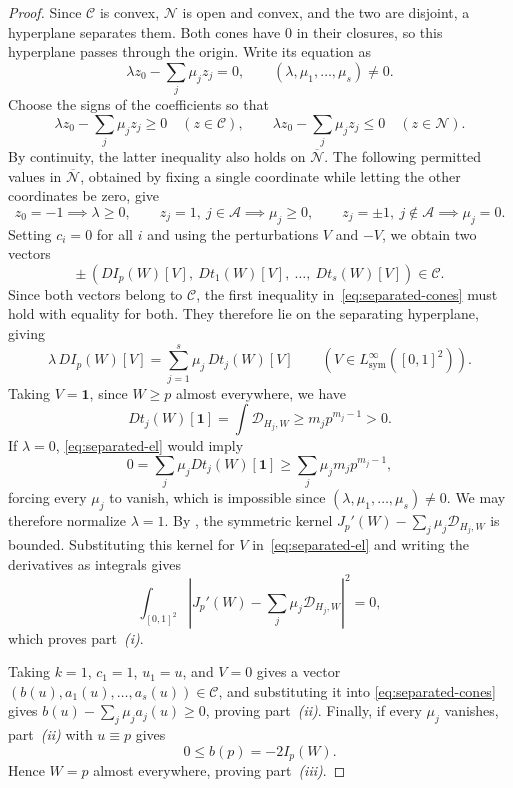 \begin{proof}
Since $\mathcal C$ is convex, $\mathcal N$ is open and
convex, and the two are disjoint, a hyperplane separates them.
Both cones have $0$ in their closures, so this hyperplane passes through
the origin.  Write its equation as
\[
  \lambda z_0-\sum_j\mu_jz_j=0,\qquad
  (\lambda,\mu_1,\dots,\mu_s)\ne0.
\]
Choose the signs of the coefficients so that
\begin{equation}\label{eq:separated-cones}
  \lambda z_0-\sum_j\mu_jz_j\ge0\quad(z\in\mathcal C),\qquad
  \lambda z_0-\sum_j\mu_jz_j\le0\quad(z\in\mathcal N).
\end{equation}
By continuity, the latter inequality also holds on $\overline{\mathcal N}$.
The following permitted values in $\overline {\mathcal N}$,
obtained by fixing a single coordinate while letting the other coordinates be zero, give
\[
  z_0=-1 \implies \lambda\ge0,
  \qquad z_j=1,\ j\in\mathcal A \implies \mu_j\ge0,
  \qquad z_j=\pm1,\ j\notin\mathcal A \implies \mu_j=0.
\]
Setting $c_i=0$ for all $i$ and using the perturbations $V$ and $-V$, we obtain two vectors
\[
  \pm\,(DI_p(W)[V],\ Dt_1(W)[V],\ \dots,\ Dt_s(W)[V])\in\mathcal C.
\]
Since both vectors belong to $\mathcal C$, the first inequality
in~\eqref{eq:separated-cones} must hold with equality for both.
They therefore lie on the separating hyperplane, giving
\begin{equation}\label{eq:separated-el}
  \lambda\,DI_p(W)[V]=\sum_{j=1}^s\mu_j\,Dt_j(W)[V]
  \qquad (V\in L^\infty_{\mathrm{sym}}([0,1]^2)).
\end{equation}
Taking $V=\mathbf 1$, since $W \ge p$ almost everywhere, we have
\[
  Dt_j(W)[\mathbf1]=\int\mathcal D_{H_j,W} \ge m_jp^{m_j-1}>0.
\]
If $\lambda=0$, \eqref{eq:separated-el} would imply
\[
  0=\sum_j\mu_j Dt_j(W)[\mathbf1]
    \ge\sum_j\mu_jm_jp^{m_j-1},
\]
forcing every $\mu_j$ to vanish, which is impossible since
$(\lambda,\mu_1,\dots,\mu_s)\ne0$.  We may therefore normalize
$\lambda=1$. By , the symmetric kernel
$J_p'(W)-\sum_j\mu_j\mathcal D_{H_j,W}$ is bounded.
Substituting this kernel for $V$ in~\eqref{eq:separated-el} and writing
the derivatives as integrals gives
\[
  \int_{[0,1]^2}\left|J_p'(W)-\sum_j\mu_j\mathcal D_{H_j,W}\right|^2=0,
\]
which proves part~\textit{(i)}.

Taking $k=1$, $c_1=1$, $u_1=u$, and $V=0$ gives a vector $(b(u), a_1(u),\dots,a_s(u))\in\mathcal C$,
and substituting it into \eqref{eq:separated-cones} gives $b(u)-\sum_j\mu_ja_j(u)\ge0$,
proving part~\textit{(ii)}.
Finally, if every $\mu_j$ vanishes, part~\textit{(ii)} with $u\equiv p$ gives
\[
  0\le b(p)=-2I_p(W).
\]
Hence $W=p$ almost everywhere, proving part~\textit{(iii)}.
\end{proof}

